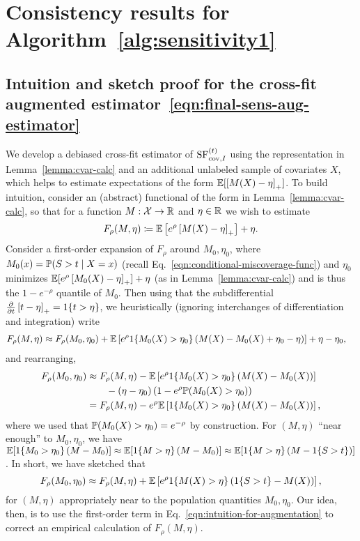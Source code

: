 \section{Consistency results for Algorithm~\ref{alg:sensitivity1}}

\subsection{Intuition and sketch proof for the cross-fit augmented estimator~\eqref{eqn:final-sens-aug-estimator}}
\label{sec:cross-fit-sketch-proof-intuition}
We develop a debiased cross-fit estimator of $\SFcov$
using the representation in Lemma~\ref{lemma:cvar-calc}
and an additional unlabeled sample of covariates $X$, which helps to
estimate expectations of the form $\E[\hinge{M(X) - \eta}]$.
To build intuition, consider an (abstract)
functional of the form in Lemma~\ref{lemma:cvar-calc},
so that for a function $M : \mc{X} \to \R$ and $\eta \in \R$ we wish
to estimate
\begin{equation*}
  F_\rho(M, \eta) \defeq \E\left[e^\rho \hinge{M(X) - \eta}\right] + \eta.
\end{equation*}
Consider a first-order expansion of $F_\rho$ around $M_0, \eta_0$, where
$M_0(x) = \P(S > \predsetthresh \mid X = x)$ (recall
Eq.~\eqref{eqn:conditional-miscoverage-func}) and $\eta_0$ minimizes
$\E[e^\rho\hinge{M_0(X) - \eta}] + \eta$ (as in Lemma~\ref{lemma:cvar-calc})
and is thus the $1 - e^{-\rho}$ quantile of $M_0$. Then using that the
subdifferential $\frac{\partial}{\partial t} \hinge{t - \eta} = \indic{t >
  \eta}$, we heuristically (ignoring interchanges of differentiation and
integration) write
\begin{align*}
  F_\rho(M, \eta)
  & \approx F_\rho(M_0, \eta_0)
  + \E\left[ e^\rho \indic{M_0(X) > \eta_0}
    \left(M(X) - M_0(X) + \eta_0 - \eta\right) \right]
  + \eta - \eta_0,
\end{align*}
and rearranging,
\begin{align*}
  F_\rho(M_0, \eta_0)
  & \approx F_\rho(M, \eta)
  - \E\left[ e^\rho \indic{M_0(X) > \eta_0}
    \left(M(X) - M_0(X)\right)\right] \\
  & \qquad - (\eta - \eta_0)
  \left(1 - e^\rho \P(M_0(X) > \eta_0)\right) \\
  & = F_\rho(M, \eta) - e^\rho \E\left[\indic{M_0(X) > \eta_0}
    \left(M(X) - M_0(X)\right)\right],
\end{align*}
where we used that $\P(M_0(X) > \eta_0) = e^{-\rho}$ by construction.
For $(M, \eta)$ ``near enough'' to $M_0, \eta_0$, we
have $\E[\indic{M_0 > \eta_0}(M - M_0)]
\approx \E[\indic{M > \eta}(M - M_0)]
\approx \E[\indic{M > \eta} (M - \indic{S > \predsetthresh})]$.
In short, we have sketched that
\begin{equation}
  F_\rho(M_0, \eta_0)
  \approx F_\rho(M, \eta)
  + \E\left[e^\rho
    \indic{M(X) > \eta} \left(\indic{S > \predsetthresh}
    - M(X) \right) \right],
  \label{eqn:intuition-for-augmentation}
\end{equation}
for $(M, \eta)$ appropriately near to the population quantities $M_0,
\eta_0$.  Our idea, then, is to use the first-order term in
Eq.~\eqref{eqn:intuition-for-augmentation}
to correct an empirical calculation of $F_\rho(M, \eta)$.

